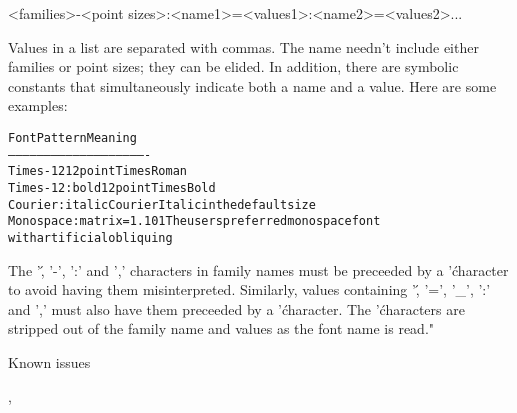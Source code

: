 \begin{Details}
\textless{}families\textgreater{}-\textless{}point sizes\textgreater{}:\textless{}name1\textgreater{}=\textless{}values1\textgreater{}:\textless{}name2\textgreater{}=\textless{}values2\textgreater{}...

Values in a list are separated with commas. The name needn't
include either families or point sizes; they can be elided. In
addition, there are symbolic constants that simultaneously
indicate both a name and a value. Here are some examples:

\begin{alltt}
Font Pattern                    Meaning
----------------------------------------------------------
Times-12                        12 point Times Roman
Times-12:bold                   12 point Times Bold
Courier:italic                  Courier Italic in the default size
Monospace:matrix=1 .1 0 1       The users preferred monospace font
                                with artificial obliquing
\end{alltt}

The '\', '-', ':' and ',' characters in family names
must be preceeded by a '\' character to avoid having them
misinterpreted. Similarly, values containing '\', '=', '\_', ':'
and ',' must also have them preceeded by a '\' character. The
'\' characters are stripped out of the family name and values
as the font name is read."
\end{Details}
\begin{Section}{Known issues}
\end{Section}
\begin{SeeAlso}\relax
{},
\end{SeeAlso}

